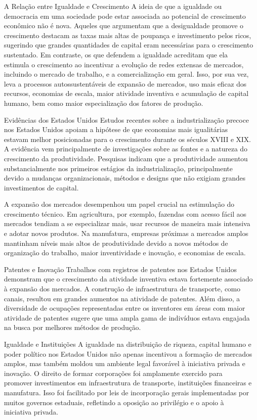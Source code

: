 \documentclass[a4paper,12pt]{article}[abntex2]
\begin{document}
A Relação entre Igualdade e Crescimento
A ideia de que a igualdade ou democracia em uma sociedade pode estar associada ao potencial de crescimento econômico não é nova. Aqueles que argumentam que a desigualdade promove o crescimento destacam as taxas mais altas de poupança e investimento pelos ricos, sugerindo que grandes quantidades de capital eram necessárias para o crescimento sustentado. Em contraste, os que defendem a igualdade acreditam que ela estimula o crescimento ao incentivar a evolução de redes extensas de mercados, incluindo o mercado de trabalho, e a comercialização em geral. Isso, por sua vez, leva a processos autossustentáveis de expansão de mercados, uso mais eficaz dos recursos, economias de escala, maior atividade inventiva e acumulação de capital humano, bem como maior especialização dos fatores de produção.

Evidências dos Estados Unidos
Estudos recentes sobre a industrialização precoce nos Estados Unidos apoiam a hipótese de que economias mais igualitárias estavam melhor posicionadas para o crescimento durante os séculos XVIII e XIX. A evidência vem principalmente de investigações sobre as fontes e a natureza do crescimento da produtividade. Pesquisas indicam que a produtividade aumentou substancialmente nos primeiros estágios da industrialização, principalmente devido a mudanças organizacionais, métodos e designs que não exigiam grandes investimentos de capital.

A expansão dos mercados desempenhou um papel crucial na estimulação do crescimento técnico. Em agricultura, por exemplo, fazendas com acesso fácil aos mercados tendiam a se especializar mais, usar recursos de maneira mais intensiva e adotar novos produtos. Na manufatura, empresas próximas a mercados amplos mantinham níveis mais altos de produtividade devido a novos métodos de organização do trabalho, maior inventividade e inovação, e economias de escala.

Patentes e Inovação
Trabalhos com registros de patentes nos Estados Unidos demonstram que o crescimento da atividade inventiva estava fortemente associado à expansão dos mercados. A construção de infraestrutura de transporte, como canais, resultou em grandes aumentos na atividade de patentes. Além disso, a diversidade de ocupações representadas entre os inventores em áreas com maior atividade de patentes sugere que uma ampla gama de indivíduos estava engajada na busca por melhores métodos de produção.

Igualdade e Instituições
A igualdade na distribuição de riqueza, capital humano e poder político nos Estados Unidos não apenas incentivou a formação de mercados amplos, mas também moldou um ambiente legal favorável à iniciativa privada e inovação. O direito de formar corporações foi amplamente exercido para promover investimentos em infraestrutura de transporte, instituições financeiras e manufatura. Isso foi facilitado por leis de incorporação gerais implementadas por muitos governos estaduais, refletindo a oposição ao privilégio e o apoio à iniciativa privada.
\end{document}
